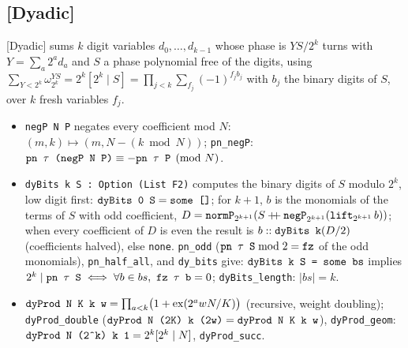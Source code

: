 \subsection{[Dyadic]}\label{sec:lean-pathsum-dyadic}

[Dyadic] sums $k$ digit variables $d_0,\dots,d_{k-1}$ whose phase is $YS/2^k$ turns with
$Y = \sum_a 2^a d_a$ and $S$ a phase polynomial free of the digits, using
$\sum_{Y<2^k}\omega_{2^k}^{YS} = 2^k[2^k\mid S] = \prod_{j<k}\sum_{f_j}(-1)^{f_jb_j}$ with $b_j$
the binary digits of $S$, over $k$ fresh variables $f_j$.

\begin{definition}\label{def:lean-pathsum-dydata}
\begin{itemize}
\item \textnormal{\texttt{negP N P}} negates every coefficient mod $N$: $(m,k)\mapsto(m, N-(k\bmod N))$;
  \textnormal{\texttt{pn\_\allowbreak{}negP}}: $\textnormal{\texttt{pn \ensuremath{\tau} (\allowbreak{}negP N P)}}\equiv-\textnormal{\texttt{pn \ensuremath{\tau} P}}\pmod N$.
\item \textnormal{\texttt{dyBits k S : Option (\allowbreak{}List F2)}} computes the binary digits of $S$ modulo $2^k$, low digit
  first: $\textnormal{\texttt{dyBits 0 S}} = \textnormal{\texttt{some []}}$; for $k+1$, $b$ is the monomials of the terms of $S$ with
  odd coefficient, $D = \textnormal{\texttt{normP}}_{2^{k+1}}(S\mathbin{+\!\!+}\textnormal{\texttt{negP}}_{2^{k+1}}(\textnormal{\texttt{lift}}_{2^{k+1}}\,b))$;
  when every coefficient of $D$ is even the result is $b :: \textnormal{\texttt{dyBits k}}(D/2)$ (coefficients
  halved), else \textnormal{\texttt{none}}. \textnormal{\texttt{pn\_\allowbreak{}odd}} ($\textnormal{\texttt{pn \ensuremath{\tau} S}} \bmod 2 = \textnormal{\texttt{fz}}$ of the odd
  monomials), \textnormal{\texttt{pn\_\allowbreak{}half\_\allowbreak{}all}}, and \textnormal{\texttt{dy\_\allowbreak{}bits}} give: $\textnormal{\texttt{dyBits k S = some bs}}$ implies
  $2^k\mid\textnormal{\texttt{pn \ensuremath{\tau} S}}\iff\forall b\in bs,\ \textnormal{\texttt{fz \ensuremath{\tau} b}} = 0$; \textnormal{\texttt{dyBits\_\allowbreak{}length}}: $|bs| = k$.
\item $\textnormal{\texttt{dyProd N K k w}} = \prod_{a<k}\bigl(1+\operatorname{ex}(2^a w N/K)\bigr)$ (recursive,
  weight doubling); \textnormal{\texttt{dyProd\_\allowbreak{}double}} ($\textnormal{\texttt{dyProd N (\allowbreak{}2K) k (\allowbreak{}2w)}} = \textnormal{\texttt{dyProd N K k w}}$),
  \textnormal{\texttt{dyProd\_\allowbreak{}geom}}: $\textnormal{\texttt{dyProd N (\allowbreak{}2\^{}k) k 1}} = 2^k[2^k\mid N]$, \textnormal{\texttt{dyProd\_\allowbreak{}succ}}.

\end{itemize}
\end{definition}
